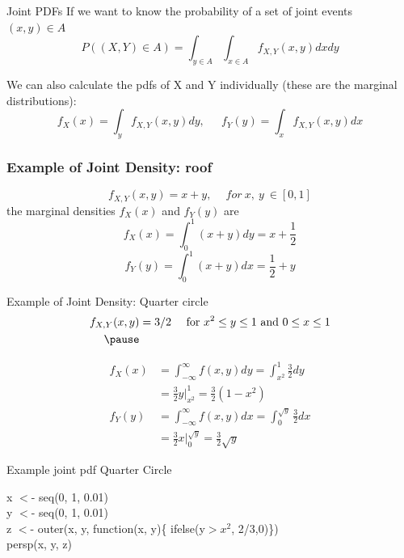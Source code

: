 \documentclass[aspectratio=169, handout]{beamer}
\numberwithin{equation}{section}
\begin{document}
\begin{frame}{Joint PDFs}
If we want to know the probability of a set of joint events $(x, y) \in A$
$$P((X,Y)\in A)=\int_{y\in A}\int_{x\in A}  f_{X,Y}(x, y) dxdy$$

We can also calculate the pdfs of X and Y individually (these are the marginal distributions):
$$f_X(x)=\int_y f_{X,Y}(x, y)dy, \ \ \quad f_Y(y)=\int_x f_{X,Y}(x, y)dx$$

\end{frame}






\begin{frame}
\frametitle{Example of Joint Density: roof}
$$f_{X,Y}(x,y) = x+y,\ \quad for\ x,\ y\ \in [0,1]$$\pause
the marginal densities $f_X(x)$ and $f_Y(y)$ are
$$f_X(x)=\int_0^1(x+y)dy= x+\frac{1}{2}$$\pause
$$f_Y(y)=\int_0^1(x+y)dx=\frac{1}{2}+y$$
\end{frame}



\begin{frame}{Example of Joint Density: Quarter circle}
\begin{align*}
f_{X,Y}(x,y) &= 3/2 \quad \text{ for }x^2\leq y\leq 1 \text{ and }0\leq x\leq 1\\\pause
\end{align*}

\begin{align*}
f_X(x) &= \int_{-\infty}^\infty f(x,y) dy =\int_{x^2}^1\frac{3}{2} dy\\
&=\frac{3}{2}y|_{x^2}^1=\frac{3}{2}(1-x^2)\\
f_Y(y) &= \int_{-\infty}^\infty f(x,y) dx=\int_{0}^{\sqrt{y}}\frac{3}{2} dx\\
&=\frac{3}{2}x|_{0}^{\sqrt{y}}=\frac{3}{2}\sqrt{y}
\end{align*}

\end{frame}


\begin{frame}{Example joint pdf Quarter Circle}

x $<$- seq(0, 1, 0.01)\\
y $<$- seq(0, 1, 0.01)\\
z $<$- outer(x, y, function(x, y)\{ ifelse(y$>x^2$, 2/3,0)\})\\
persp(x, y, z)

\end{frame}
\end{document}
